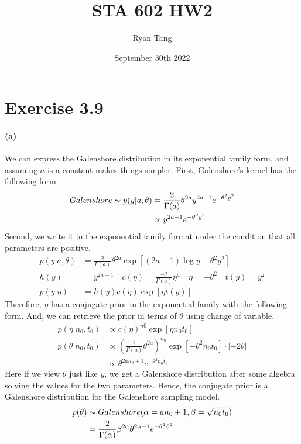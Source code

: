 \documentclass[11pt, letterpaper]{article}
\title{STA 602 HW2}
\author{Ryan Tang}
\date{September 30th 2022}
\begin{document}
\maketitle

\section{Exercise 3.9}
\paragraph{(a)}
We can express the Galenshore distribution in its exponential family form, and assuming $a$ is a constant makes things simpler.
First, Galenshore's kernel has the following form.
\begin{align*}
    Galenshore \thicksim p(y|a, \theta)
        &= \frac{2}{\Gamma(a)} \theta^{2a} y^{2a-1} e^{-\theta^2 y^2} \\
        &\propto y^{2a-1} e^{-\theta^2 y^2}
\end{align*}
Second, we write it in the exponential family format under the condition that all parameters are positive.
\begin{align*}
    p(y|a, \theta)
        &= \frac{2}{\Gamma(a)}\theta^{2a} \exp [(2a-1) \log y - \theta^2 y^2] \\
    h(y) &= y^{2a-1} \quad c(\eta) = \frac{-2}{\Gamma(a)}\eta^a \quad
    \eta = -\theta^2 \quad t(y) = y^2 \\
    p(y|\eta) &= h(y) c(\eta) \exp[\eta t(y)]
\end{align*}
Therefore, $\eta$ has a conjugate prior in the exponential family with the following form. And, we can retrieve the prior in terms of $\theta$ using change of variable. 
\begin{align*}
    p(\eta|n_0, t_0) &\propto c(\eta)^{n0} \exp[\eta n_0 t_0] \\
    p(\theta|n_0, t_0)
        &\propto (\frac{2}{\Gamma(a)}\theta^{2a})^{n_0} \exp[-\theta^2 n_0 t_0] \cdot |-2\theta| \\
        &\propto \theta^{2a n_0 + 1} e^{-\theta^2 n_0 t_0}
\end{align*}
Here if we view $\theta$ just like $y$, we get a Galenshore distribution after some algebra solving the values for the two parameters. Hence, the conjugate prior is a Galenshore distribution for the Galenshore sampling model. 
\begin{align*}
    p(\theta) &\thicksim Galenshore(\alpha=an_0 +1, \beta=\sqrt{n_0 t_0}) \\
        &= \frac{2}{\Gamma(\alpha)} \beta^{2\alpha}\theta^{2\alpha-1}e^{-\theta^2 \beta^2}
\end{align*}
\end{document}
